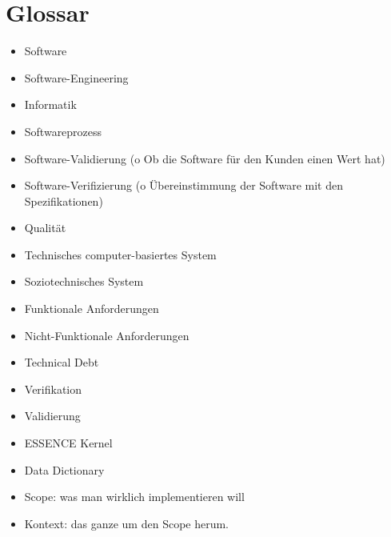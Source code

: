 \chapter{Glossar}
\begin{itemize}
\item Software
\item Software-Engineering
\item Informatik
\item Softwareprozess
\item Software-Validierung (o	Ob die Software für den Kunden einen Wert hat)
\item Software-Verifizierung (o	Übereinstimmung der Software mit den Spezifikationen)
\item Qualität
\item Technisches computer-basiertes System
\item Soziotechnisches System
\item Funktionale Anforderungen
\item Nicht-Funktionale Anforderungen
\item Technical Debt
\item Verifikation
\item Validierung
\item ESSENCE Kernel
\item Data Dictionary
\item Scope: was man wirklich implementieren will
\item Kontext: das ganze um den Scope herum.

\end{itemize}